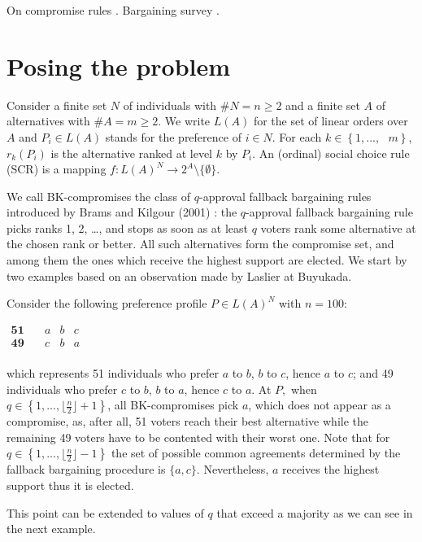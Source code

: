 \documentclass[version=3.21, pagesize, notitlepage, twoside=off, bibliography=totoc, DIV=calc, fontsize=11.5pt, a4paper]{scrartcl}
\begin{document}
On compromise rules \cite{Merlin2019}. Bargaining survey \cite{Thomson1994}.
	
\section{Posing the problem}
Consider a finite set $N$ of individuals with $\#N=n\geq 2$ and a finite set $A$ of alternatives with $\#A=m\geq 2$. We write $L(A)$ for the set of linear orders over $A$ and $P_{i}\in L(A)$ stands for the preference of $i\in N$. For each $k\in \left\{ 1,...,\text{ }m\right\} $, $r_{k}(P_{i})$ is the alternative ranked at level $k$ by $P_{i}$. An (ordinal) social choice rule (SCR) is a mapping $f:L(A)^{N}\rightarrow 2^{A} \setminus \{\emptyset \}$.

We call BK-compromises the class of $q$-approval fallback bargaining rules introduced by Brams and Kilgour (2001) \cite{Brams2001}: the $q$-approval fallback bargaining rule picks ranks 1, 2, …, and stops as soon as at least $q$ voters rank some alternative at the chosen rank or better. All such alternatives form the compromise set, and among them the ones which receive the highest support are elected.
We start by two examples based on an observation made by Laslier at Buyukada. 
\begin{example}
	Consider the following preference profile $P\in L(A)^{N}$ with $n=100$:
	\begin{center}
		$
		\begin{array}{cccc}
		\mathbf{51} \quad &a&b&c\\
		\mathbf{49} \quad &c&b&a\\
		\end{array}
		$
	\end{center}
	which represents 51 individuals who prefer $a$ to $b$, $b$ to $c$, hence $a$ to $c$; and 49 individuals who prefer $c$ to $b$, $b$ to $a$, hence $c$ to $a $. At $P,$ when $q\in \left\{ 1,..., \lfloor \frac{n}{2}\rfloor +1\right\} $, all BK-compromises pick $a$, which does not appear as a compromise, as, after all, 51 voters reach their best alternative while the remaining 49 voters have to be contented with their worst one. Note that for $q\in \left\{ 1,..., \lfloor \frac{n}{2}\rfloor -1 \right\} $ the set of possible common agreements determined by the fallback bargaining procedure is $\{a,c\}$. Nevertheless, $a$ receives the highest support thus it is elected.
\end{example}

This point can be extended to values of $q$ that exceed a majority as we can see in the next example.
\end{document}
